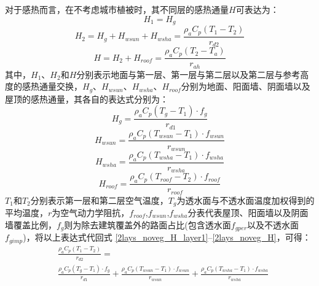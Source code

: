 对于感热而言，在不考虑城市植被时，其不同层的感热通量$H$可表达为：
\begin{equation}\label{2lays_noveg_H_layer1}
    H_{1} = H_{g}
\end{equation}
%
\begin{equation}\label{2lays_noveg_H_layer2}
    H_{2} = H_{g} + H_{wsun} + H_{wsha} = \frac{\rho _a C_p \left( T_{1} - T_{2} \right)}{r_{d2}}
\end{equation}
%
\begin{equation}\label{2lays_noveg_H}
    H = H_{2} + H_{roof} = \frac{\rho _a C_p \left( T_{2} - T_a \right)}{r_{ah}}
\end{equation}
其中，$H_1$、$H_2$和$H$分别表示地面与第一层、第一层与第二层以及第二层与参考高度的感热通量交换，$H_{g}$、$H_{wsun}$、$H_{wsha}$、$H_{roof}$分别为地面、阳面墙、阴面墙以及屋顶的感热通量，其各自的表达式分别为：
\begin{equation}\label{urban_noveg_Hg}
    H_{g} = \frac{\rho _a C_p \left( T_{g} - T_{1} \right) \cdot f_{g}}{r_{d1}}
\end{equation}
%
\begin{equation}
    H_{wsun} = \frac{\rho  _a C_p \left( T_{wsun} - T_{1} \right) \cdot f_{wsun}}{r_{wsun}}
\end{equation}
%
\begin{equation}
    H_{wsha} = \frac{\rho _a C_p \left( T_{wsha} - T_{1} \right) \cdot f_{wsha}}{r_{wsha}}
\end{equation}
%
\begin{equation}\label{urban_noveg_Hroof}
    H_{roof} = \frac{\rho _a C_p \left( T_{roof} - T_{2} \right) \cdot f_{roof}}{r_{roof}}
\end{equation}
$T_1$和$T_2$分别表示第一层和第二层空气温度，$T_{g}$为透水面与不透水面温度加权得到的平均温度，$r$为空气动力学阻抗，\allowbreak $f_{roof}$,\allowbreak  $f_{wsun}$,\allowbreak  $f_{wsha}$分表代表屋顶、阳面墙以及阴面墙覆盖比例，$f_{g}$则为除去建筑覆盖外的路面占比(包含透水面$f_{gper}$以及不透水面$f_{gimp}$)，将以上表达式代回式 \ref{2lays_noveg_H_layer1}--\ref{2lays_noveg_H}，可得：
\begin{equation}
    \begin{split}
        & \frac{\rho _a C_p \left( T_{1} - T_{2} \right)}{r_{d2}} = \\
        & \frac{\rho _a C_p \left( T_{g} - T_{1} \right) \cdot f_{g}}{r_{d1}} + \frac{\rho _a C_p \left( T_{wsun} - T_{1} \right) \cdot f_{wsun}}{r_{wsun}} + \frac{\rho _a C_p \left( T_{wsha} - T_{1} \right) \cdot f_{wsha}}{r_{wsha}}
    \end{split}
\end{equation}
